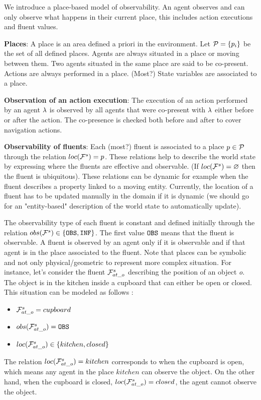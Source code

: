 \documentclass[letterpaper]{article} %
\begin{document}
We introduce a place-based model of observability. An agent observes and can only observe what happens in their current place, this includes action executions and fluent values.

\textbf{Places}: 
A place is an area defined a priori in the environment. Let $\mathcal{P}=\{ p_i \}$ be the set of all defined places. Agents are always situated in a place or moving between them. Two agents situated in the same place are said to be co-present. Actions are always performed in a place. (Most?) State variables are associated to a place.

\textbf{Observation of an action execution}: 
The execution of an action performed by an agent $\lambda$ is observed by all agents that were co-present with $\lambda$ either before or after the action. The co-presence is checked both before and after to cover navigation actions.

\textbf{Observability of fluents}:
Each (most?) fluent is associated to a place $p \in \mathcal{P}$ through the relation $loc( \mathcal{F}^{s}_{} )=p$. These relations help to describe the world state by expressing where the fluents are effective and observable. (If $loc( \mathcal{F}^{s}_{} ) = \varnothing $ then the fluent is ubiquitous). These relations can be dynamic for example when the fluent describes a property linked to a moving entity. Currently, the location of a fluent has to be updated manually in the domain if it is dynamic (we should go for an "entity-based" description of the world state to automatically update).

The observability type of each fluent is constant and defined initially through the relation $obs( \mathcal{F}^{s}_{} ) \in \{ \texttt{OBS}, \texttt{INF} \}$. 
The first value $\texttt{OBS}$ means that the fluent is observable. A fluent is observed by an agent only if it is observable and if that agent is in the place associated to the fluent. 
Note that places can be symbolic and not only physical/geometric to represent more complex situation. For instance, let's consider the fluent $\mathcal{F}^{s}_{at\_o}$ describing the position of an object \textit{o}. The object is in the kitchen inside a cupboard that can either be open or closed. This situation can be modeled as follows :
\begin{itemize}
    \item $\mathcal{F}^{s}_{at\_o}=cupboard$
    \item $obs( \mathcal{F}^{s}_{at\_o} )=\texttt{OBS}$
    \item $loc( \mathcal{F}^{s}_{at\_o} ) \in \{ kitchen, closed \}$
\end{itemize}
The relation $loc( \mathcal{F}^{s}_{at\_o} ) = kitchen$ corresponds to when the cupboard is open, which means any agent in the place $kitchen$ can observe the object. On the other hand, when the cupboard is closed, $loc( \mathcal{F}^{s}_{at\_o} ) = closed$, the agent cannot observe the object.
\end{document}
